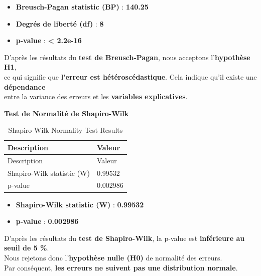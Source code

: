 \documentclass[
  12pt,
]{article}
\providecommand{\tightlist}{%
  \setlength{\itemsep}{0pt}\setlength{\parskip}{0pt}}
\begin{document}
\begin{itemize}
\tightlist
\item
  \textbf{Breusch-Pagan statistic (BP)} : \textbf{140.25}\\
\item
  \textbf{Degrés de liberté (df)} : \textbf{8}\\
\item
  \textbf{p-value} : \textbf{\textless{} 2.2e-16}
\end{itemize}

D'après les résultats du \textbf{test de Breusch-Pagan}, nous acceptons
l'\textbf{hypothèse H1},\\
ce qui signifie que \textbf{l'erreur est hétéroscédastique}. Cela
indique qu'il existe une \textbf{dépendance}\\
entre la variance des erreurs et les \textbf{variables explicatives}.

\textbf{Test de Normalité de Shapiro-Wilk}

\begin{longtable}[]{@{}ll@{}}
\caption{Shapiro-Wilk Normality Test Results}\tabularnewline
\toprule\noalign{}
Description & Valeur \\
\midrule\noalign{}
\endfirsthead
\toprule\noalign{}
Description & Valeur \\
\midrule\noalign{}
\endhead
\bottomrule\noalign{}
\endlastfoot
Shapiro-Wilk statistic (W) & 0.99532 \\
p-value & 0.002986 \\
\end{longtable}

\begin{itemize}
\tightlist
\item
  \textbf{Shapiro-Wilk statistic (W)} : \textbf{0.99532}\\
\item
  \textbf{p-value} : \textbf{0.002986}
\end{itemize}

D'après les résultats du \textbf{test de Shapiro-Wilk}, la p-value est
\textbf{inférieure au seuil de 5 \%}.\\
Nous rejetons donc l'\textbf{hypothèse nulle (H0)} de normalité des
erreurs.\\
Par conséquent, \textbf{les erreurs ne suivent pas une distribution
normale}.
\end{document}
